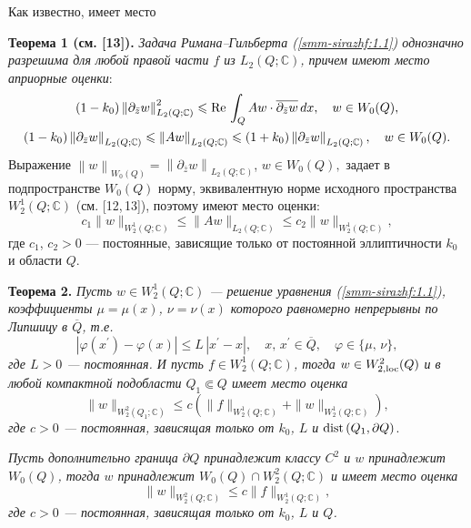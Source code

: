 \documentclass[a4paper,12pt]{article}
\theoremstyle{definition}
\begin{document}
Как известно, имеет место

\textbf{Теорема 1 (см. [13]).}
{\it Задача Римана--Гильберта {\rm (\ref{smm-sirazhf:1.1})} однозначно разрешима для любой правой части $f$ из $L_2(Q;\mathbb{C})$,
	причем имеют место априорные оценки}:
\begin{gather}\label{smm-0sirazhf:1.3}
	(1-k_0)\left\|\partial_{\bar{z}}w\right\|^2_{L_2(Q;\mathbb{C})}\leqslant \text{Re\,} \int_{Q} Aw\cdot \overline{\partial_{\bar{z}}w}\,dx,\quad w\in W_0(Q),\\
	\label{smm-0sirazhf:1.4}
	(1-k_0)\left\|\partial_{\bar{z}}w\right\|_{L_2(Q;\mathbb{C})}\leqslant \left\| Aw\right\|_{L_2(Q;\mathbb{C})} \leqslant
	(1+k_0)\left\|\partial_{\bar{z}}w\right\|_{L_2(Q;\mathbb{C})}, \quad w\in W_0(Q).
\end{gather}
Выражение
$
\left\| w\right\|_{W_0(Q)}=\left\| \partial_{\bar{z}}w\right\|_{L_2(Q;\mathbb{C})}$, $w\in W_0(Q),
$
задает в подпространстве $W_0(Q)$ норму, эквивалентную норме исходного пространства $W_2^1(Q;\mathbb{C})$ (см.  [12,\,13]),
поэтому имеют место оценки:
\begin{equation}\label{smm-0sirazhf:1.5}
	c_1\|w\|_{W^1_2(Q;\mathbb{C})}\leqslant\|Aw\|_{L_2(Q;\mathbb{C})}\leqslant c_2 \|w\|_{W^1_2(Q;\mathbb{C})},
\end{equation}
где $c_1$, $c_2>0$ --- постоянные, зависящие только от постоянной эллиптичности $k_0$ и области $Q$.

\smallskip
\textbf{Теорема 2.} \textit{Пусть $w\in W_2^1(Q;\mathbb{C})$ --- решение уравнения  {\rm (\ref{smm-sirazhf:1.1})}, коэффициенты $\mu=\mu(x)$, $\nu=\nu(x)$ которого равномерно непрерывны по Липшицу в $\overline Q$, т.е.
	$$
	|\varphi(x^\prime)-\varphi(x)|\leqslant L\,|x^\prime-x|,\quad x,\,x^\prime\in \overline{Q},\quad \varphi\in\{\mu,\,\nu\},
	$$
	где $L>0$ --- постоянная. И пусть  $f\in W_2^1(Q;\mathbb{C})$, тогда $w\in W_{2,\text{\rm loc}}^2(Q)$ и в любой компактной подобласти $Q_1\Subset Q$ имеет место оценка
	\begin{equation}\label{smm-0sirazhf:1.6_1}
		\|w\|_{W^2_2(Q_1; \mathbb{C})}\leqslant c\left(\|f\|_{W^1_2(Q; \mathbb{C})}+\|w\|_{W^1_2(Q; \mathbb{C})}\right),
	\end{equation}
	где $c>0$ --- постоянная, зависящая только от $k_0$, $L$ и $\text{\rm dist\,}(Q_1,\partial Q)$}.

\textit{Пусть дополнительно граница $\partial Q$ принадлежит классу $C^2$ и $w$ принадлежит $W_0(Q)$, тогда $w$ принадлежит $W_0(Q)\cap W_2^2(Q; \mathbb{C})$ и имеет место оценка}
\begin{equation}\label{smm-0sirazhf:1.6_2}
	\|w\|_{W^2_2(Q; \mathbb{C})}\leqslant c\|f\|_{W^1_2(Q; \mathbb{C})},
\end{equation}
\textit{где $c>0$ --- постоянная, зависящая только от $k_0$, $L$ и $Q$.}
\end{document}
